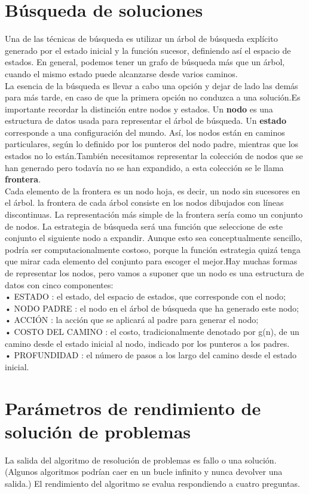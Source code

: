 \documentclass[12pt,a4paper]{report}
\begin{document}
\section{Búsqueda de soluciones}
Una de las técnicas de búsqueda es utilizar un árbol de búsqueda explícito generado por el estado inicial y la función sucesor, definiendo así el espacio de estados. En general, podemos tener un grafo de búsqueda más que un árbol, cuando el mismo estado puede alcanzarse desde varios caminos.\\La esencia de la búsqueda es llevar a cabo una opción y dejar de lado las demás para más tarde, en caso de que la primera opción no conduzca a una solución.Es importante recordar la distinción entre nodos y estados. Un \textbf{nodo} es una estructura de datos usada para representar el árbol de búsqueda. Un \textbf{estado} corresponde a una configuración del mundo. Así, los nodos están en caminos particulares, según lo definido por los punteros del nodo padre, mientras que los estados no lo están.También necesitamos representar la colección de nodos que se han generado pero todavía no se han expandido, a esta colección se le llama \textbf{frontera}.\\Cada elemento de la frontera es un nodo hoja, es decir, un nodo sin sucesores en el árbol. la frontera de cada árbol consiste en los nodos dibujados con líneas discontinuas. La representación más simple de la frontera sería como un conjunto de nodos. La estrategia de búsqueda será una función que seleccione de este conjunto el siguiente nodo a expandir. Aunque esto sea conceptualmente sencillo, podría ser computacionalmente costoso, porque la función estrategia quizá tenga que mirar cada elemento del conjunto para escoger el mejor.Hay muchas formas de representar los nodos, pero vamos a suponer que un nodo es una estructura de datos con cinco componentes:\\• ESTADO : el estado, del espacio de estados, que corresponde con el nodo;\\• NODO PADRE : el nodo en el árbol de búsqueda que ha generado este nodo;\\• ACCIÓN : la acción que se aplicará al padre para generar el nodo;\\• COSTO DEL CAMINO : el costo, tradicionalmente denotado por g(n), de un camino desde el estado inicial al nodo, indicado por los punteros a los padres. \\• PROFUNDIDAD : el número de pasos a los largo del camino desde el estado inicial.
\section{Parámetros de rendimiento de solución de problemas}
La salida del algoritmo de resolución de problemas es fallo o una solución. (Algunos algoritmos podrían caer en un bucle infinito y nunca devolver una salida.) El rendimiento del algoritmo se evalua respondiendo a cuatro preguntas.
\end{document}
